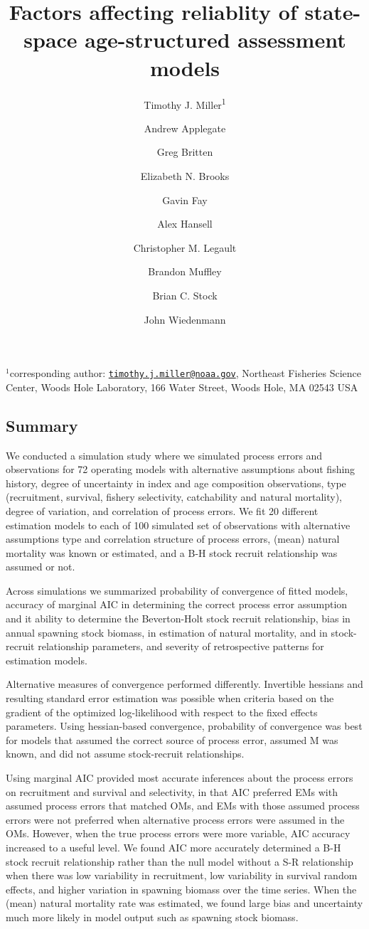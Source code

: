 \documentclass[
  12pt,
]{article}
\title{Factors affecting reliablity of state-space age-structured
assessment models}
\author{Timothy J. Miller\textsuperscript{1} \and Andrew
Applegate \and Greg Britten \and Elizabeth N. Brooks \and Gavin
Fay \and Alex Hansell \and Christopher M. Legault \and Brandon
Muffley \and Brian C. Stock \and John Wiedenmann}
\date{}
\begin{document}
\maketitle

\(^1\)corresponding author:
\href{mailto:timothy.j.miller@noaa.gov}{\nolinkurl{timothy.j.miller@noaa.gov}},
Northeast Fisheries Science Center, Woods Hole Laboratory, 166 Water
Street, Woods Hole, MA 02543 USA\\

\pagebreak

\hypertarget{summary}{%
\subsection*{Summary}\label{summary}}

We conducted a simulation study where we simulated process errors and
observations for 72 operating models with alternative assumptions about
fishing history, degree of uncertainty in index and age composition
observations, type (recruitment, survival, fishery selectivity,
catchability and natural mortality), degree of variation, and
correlation of process errors. We fit 20 different estimation models to
each of 100 simulated set of observations with alternative assumptions
type and correlation structure of process errors, (mean) natural
mortality was known or estimated, and a B-H stock recruit relationship
was assumed or not.

Across simulations we summarized probability of convergence of fitted
models, accuracy of marginal AIC in determining the correct process
error assumption and it ability to determine the Beverton-Holt stock
recruit relationship, bias in annual spawning stock biomass, in
estimation of natural mortality, and in stock-recruit relationship
parameters, and severity of retrospective patterns for estimation
models.

Alternative measures of convergence performed differently. Invertible
hessians and resulting standard error estimation was possible when
criteria based on the gradient of the optimized log-likelihood with
respect to the fixed effects parameters. Using hessian-based
convergence, probability of convergence was best for models that assumed
the correct source of process error, assumed M was known, and did not
assume stock-recruit relationships.

Using marginal AIC provided most accurate inferences about the process
errors on recruitment and survival and selectivity, in that AIC
preferred EMs with assumed process errors that matched OMs, and EMs with
those assumed process errors were not preferred when alternative process
errors were assumed in the OMs. However, when the true process errors
were more variable, AIC accuracy increased to a useful level. We found
AIC more accurately determined a B-H stock recruit relationship rather
than the null model without a S-R relationship when there was low
variability in recruitment, low variability in survival random effects,
and higher variation in spawning biomass over the time series. When the
(mean) natural mortality rate was estimated, we found large bias and
uncertainty much more likely in model output such as spawning stock
biomass.
\end{document}
